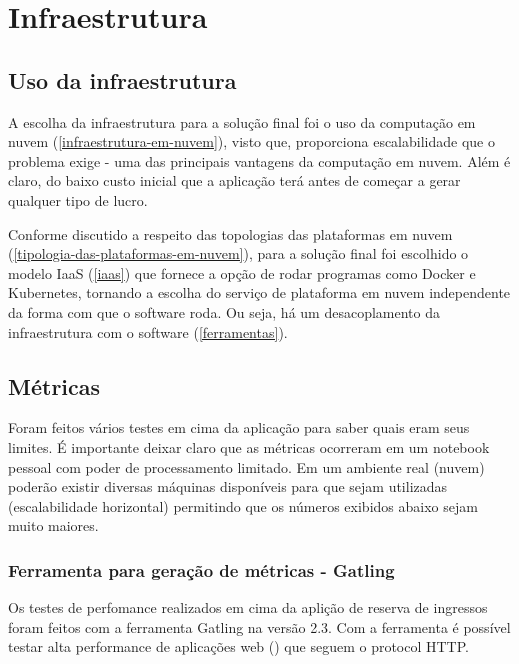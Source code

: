 \chapter{Infraestrutura}

\section{Uso da infraestrutura}

A escolha da infraestrutura para a solução final foi o uso da
computação em nuvem (\autoref{infraestrutura-em-nuvem}), visto que, proporciona
escalabilidade que o problema exige - uma das principais vantagens da computação em nuvem.
Além é claro, do baixo custo inicial que a aplicação terá antes de começar a gerar qualquer
tipo de lucro.

Conforme discutido a respeito das topologias das plataformas em
nuvem (\autoref{tipologia-das-plataformas-em-nuvem}), para a solução final foi escolhido o
modelo IaaS (\autoref{iaas}) que fornece a opção de rodar programas como Docker e
Kubernetes, tornando a escolha do serviço de plataforma em nuvem independente da forma
com que o software roda. Ou seja, há um desacoplamento da infraestrutura com o software
(\autoref{ferramentas}).

\section{Métricas}

Foram feitos vários testes em cima da aplicação para saber quais eram seus limites.
É importante deixar claro que as métricas ocorreram em um notebook pessoal com poder
de processamento limitado. Em um ambiente real (nuvem) poderão existir diversas máquinas
disponíveis para que sejam utilizadas (escalabilidade horizontal) permitindo que os
números exibidos abaixo sejam muito maiores.

\subsection{Ferramenta para geração de métricas - Gatling}

Os testes de perfomance realizados em cima da aplição de reserva de ingressos foram
feitos com a ferramenta Gatling na versão 2.3.
Com a ferramenta é possível testar alta performance de aplicações web
(\cite{gatling-docs}) que seguem o protocol HTTP.

